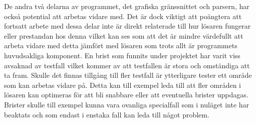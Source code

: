 \newline \newline
De andra två delarna av programmet, det grafiska gränssnittet och parsern, har också potential att arbetas vidare med. Det är dock viktigt att poängtera att fortsatt arbete med dessa delar inte är direkt relaterade till hur lösaren fungerar eller prestandan hos denna vilket kan ses som att det är mindre värdefullt att arbeta vidare med detta jämfört med lösaren som trots allt är programmets huvudsakliga komponent.
\newline \newline
En brist som funnits under projektet har varit viss avsaknad av testfall vilket kommer av att testfallen är stora och omständiga att ta fram. Skulle det finnas tillgång till fler testfall är ytterligare tester ett område som kan arbetas vidare på. Detta kan till exempel leda till att fler områden i lösaren kan optimeras för att bli snabbare eller att eventuella brister uppdagas. Brister skulle till exempel kunna vara ovanliga specialfall som i nuläget inte har beaktats och som endast i enstaka fall kan leda till något problem.
